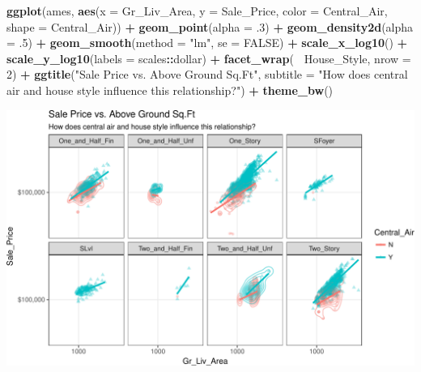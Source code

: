 \documentclass[]{article}
\newenvironment{Shaded}{\begin{snugshade}}{\end{snugshade}}
\newcommand{\KeywordTok}[1]{\textcolor[rgb]{0.13,0.29,0.53}{\textbf{#1}}}
\newcommand{\DataTypeTok}[1]{\textcolor[rgb]{0.13,0.29,0.53}{#1}}
\newcommand{\DecValTok}[1]{\textcolor[rgb]{0.00,0.00,0.81}{#1}}
\newcommand{\StringTok}[1]{\textcolor[rgb]{0.31,0.60,0.02}{#1}}
\newcommand{\OtherTok}[1]{\textcolor[rgb]{0.56,0.35,0.01}{#1}}
\newcommand{\OperatorTok}[1]{\textcolor[rgb]{0.81,0.36,0.00}{\textbf{#1}}}
\newcommand{\NormalTok}[1]{#1}
\begin{document}
\begin{Shaded}
\begin{Highlighting}[]
\KeywordTok{ggplot}\NormalTok{(ames, }\KeywordTok{aes}\NormalTok{(}\DataTypeTok{x =}\NormalTok{ Gr_Liv_Area, }\DataTypeTok{y =}\NormalTok{ Sale_Price, }\DataTypeTok{color =}\NormalTok{ Central_Air, }\DataTypeTok{shape =}\NormalTok{ Central_Air)) }\OperatorTok{+}
\StringTok{  }\KeywordTok{geom_point}\NormalTok{(}\DataTypeTok{alpha =}\NormalTok{ .}\DecValTok{3}\NormalTok{) }\OperatorTok{+}
\StringTok{  }\KeywordTok{geom_density2d}\NormalTok{(}\DataTypeTok{alpha =}\NormalTok{ .}\DecValTok{5}\NormalTok{) }\OperatorTok{+}
\StringTok{  }\KeywordTok{geom_smooth}\NormalTok{(}\DataTypeTok{method =} \StringTok{"lm"}\NormalTok{, }\DataTypeTok{se =} \OtherTok{FALSE}\NormalTok{) }\OperatorTok{+}
\StringTok{  }\KeywordTok{scale_x_log10}\NormalTok{() }\OperatorTok{+}
\StringTok{  }\KeywordTok{scale_y_log10}\NormalTok{(}\DataTypeTok{labels =}\NormalTok{ scales}\OperatorTok{::}\NormalTok{dollar) }\OperatorTok{+}
\StringTok{  }\KeywordTok{facet_wrap}\NormalTok{(}\OperatorTok{~}\StringTok{ }\NormalTok{House_Style, }\DataTypeTok{nrow =} \DecValTok{2}\NormalTok{) }\OperatorTok{+}
\StringTok{  }\KeywordTok{ggtitle}\NormalTok{(}\StringTok{"Sale Price vs. Above Ground Sq.Ft"}\NormalTok{,}
          \DataTypeTok{subtitle =} \StringTok{"How does central air and house style influence this relationship?"}\NormalTok{) }\OperatorTok{+}
\StringTok{  }\KeywordTok{theme_bw}\NormalTok{()}
\end{Highlighting}
\end{Shaded}

\begin{center}\includegraphics{Chapter_3_-_Visualization_files/figure-latex/multivar1-1} \end{center}
\end{document}

